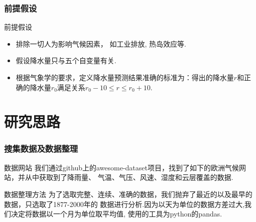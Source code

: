 \documentclass[10pt]{beamer}
\begin{document}
\begin{frame}
	\frametitle{前提假设}
	\begin{block}{前提假设}
		\begin{itemize}
			\item 排除一切人为影响气候因素， 如工业排放, 热岛效应等.
			\item 假设降水量只与五个自变量有关.
			\item 根据气象学的要求，定义降水量预测结果准确的标准为：得出的降水量$r$和正确的降水量$r_0$满足关系$r_0 - 10 \le r \le r_0 + 10$.
		\end{itemize}
	\end{block}
\end{frame}

\section{研究思路}

%

\begin{frame}
	\frametitle{搜集数据及数据整理}
	\begin{block}{数据网站}
		我们通过github上的awesome-dataset项目，找到了如下的欧洲气候网站，并从中获取到了降雨量、
		气温、气压、风速、湿度和云层覆盖的数据.
	\end{block}
	\begin{block}{数据整理方法}
		为了选取完整、连续、准确的数据，我们抛弃了最近的以及最早的数据，只选取了1877-2000年的
		数据进行分析.因为以天为单位的数据方差过大,我们决定将数据以一个月为单位取平均值,
		使用的工具为python的pandas.
	\end{block}
\end{frame}
\end{document}
